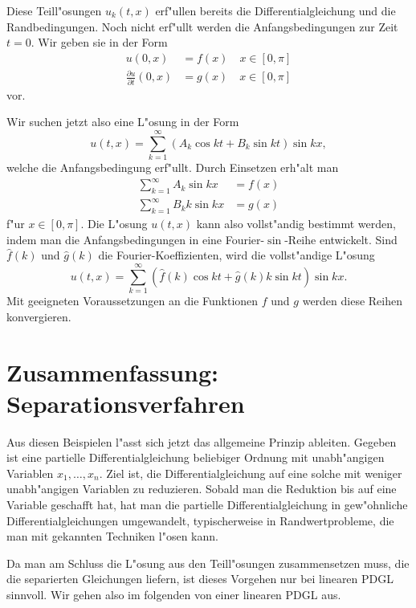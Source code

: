 Diese Teill"osungen $u_k(t,x)$ erf"ullen bereits die Differentialgleichung
und die Randbedingungen. Noch nicht erf"ullt werden die Anfangsbedingungen
zur Zeit $t=0$. Wir geben sie in der Form
\begin{align*}
u(0,x)&=f(x)\quad x\in[0,\pi]\\
\frac{\partial u}{\partial t}(0,x)&=g(x)\quad x\in[0,\pi]
\end{align*}
vor.

Wir suchen jetzt also eine L"osung in der Form
\[
u(t,x)=\sum_{k=1}^{\infty}
\left(A_k\cos kt+B_k\sin kt\right)
\sin kx,
\]
welche die Anfangsbedingung erf"ullt. Durch Einsetzen erh"alt
man
\begin{align*}
\sum_{k=1}^{\infty}
A_k \sin kx
&=f(x)
\\
\sum_{k=1}^{\infty}
B_kk\sin kx
&=g(x)
\end{align*}
f"ur $x\in[0,\pi]$.
Die L"osung $u(t,x)$ kann also vollst"andig bestimmt werden, indem man
die Anfangsbedingungen in eine Fourier-$\sin$-Reihe entwickelt. Sind
$\hat f(k)$ und $\hat g(k)$ die Fourier-Koeffizienten, wird die
vollst"andige L"osung
\[
u(t,x)
=
\sum_{k=1}^{\infty}(\hat f(k)\cos kt+\hat g(k)k\sin kt)\sin kx.
\]
Mit geeigneten Voraussetzungen an die Funktionen $f$ und $g$ werden
diese Reihen konvergieren.

\section{Zusammenfassung: Separationsverfahren}
Aus diesen Beispielen l"asst sich jetzt das allgemeine Prinzip 
ableiten. Gegeben ist eine partielle Differentialgleichung
beliebiger Ordnung mit unabh"angigen Variablen $x_1,\dots,x_n$.
Ziel ist, die Differentialgleichung auf eine solche mit weniger
unabh"angigen Variablen zu reduzieren. Sobald man die Reduktion
bis auf eine Variable geschafft hat, hat man die partielle
Differentialgleichung in gew"ohnliche Differentialgleichungen
umgewandelt, typischerweise in Randwertprobleme,
die man mit gekannten Techniken l"osen kann.

Da man am Schluss die L"osung aus den Teill"osungen zusammensetzen
muss, die die separierten Gleichungen liefern, ist dieses Vorgehen
nur bei linearen PDGL sinnvoll. Wir gehen also im folgenden von
einer linearen PDGL aus.

